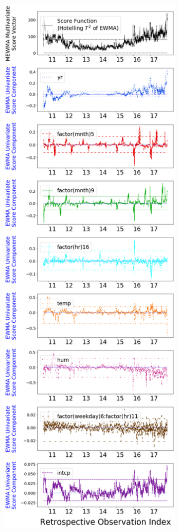 \documentclass[twoside,11pt]{article}
\begin{document}
\begin{figure}[H]
\begin{subfigure}[t]{0.35\linewidth}
     \captionsetup{width=.95\linewidth}
     \caption{}
     \label{fig:bs_retro}
\end{subfigure}
\begin{subfigure}[t]{0.35\linewidth}
     \centering
         \includegraphics[width=1.0\textwidth, trim=.0in .0in .0in .0in, clip]{../figures/v14/bike_sharing/reg_lin_B_1/quadr/PII_neg_single_retro_bike_fisher_mlines_with_regu_1e-08_0_0001_0_01_99_99.png}

\end{subfigure}
\end{figure}
\end{document}
